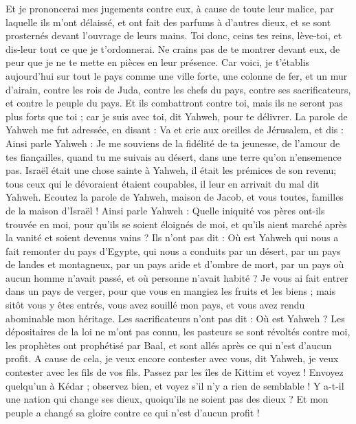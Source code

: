 \begin{multicols}{2}
Et je prononcerai mes jugements contre eux, à cause de toute leur malice, par laquelle ils m'ont délaissé, et ont fait des parfums à d'autres dieux, et se sont prosternés devant l'ouvrage de leurs mains. 
Toi donc, ceins tes reins, lève-toi, et dis-leur tout ce que je t'ordonnerai. Ne crains pas de te montrer devant eux, de peur que je ne te mette en pièces en leur présence.
Car voici, je t'établis aujourd'hui sur tout le pays comme une ville forte, une colonne de fer, et un mur d'airain, contre les rois de Juda, contre les chefs du pays, contre ses sacrificateurs, et contre le peuple du pays.
Et ils combattront contre toi, mais ils ne seront pas plus forts que toi ; car je suis avec toi, dit Yahweh, pour te délivrer.
\VerseOne{}La parole de Yahweh me fut adressée, en disant :
Va et crie aux oreilles de Jérusalem, et dis : Ainsi parle Yahweh : Je me souviens de la fidélité de ta jeunesse, de l'amour de tes fiançailles, quand tu me suivais au désert, dans une terre qu'on n'ensemence pas. 
Israël était une chose sainte à Yahweh, il était les prémices de son revenu; tous ceux qui le dévoraient étaient coupables, il leur en arrivait du mal dit Yahweh.
Ecoutez la parole de Yahweh, maison de Jacob, et vous toutes, familles de la maison d'Israël !
Ainsi parle Yahweh : Quelle iniquité vos pères ont-ils trouvée en moi, pour qu’ils se soient éloignés de moi, et qu’ils aient marché après la vanité et soient devenus vains ?
Ils n'ont pas dit : Où est Yahweh qui nous a fait remonter du pays d'Egypte, qui nous a conduits par un désert, par un pays de landes et montagneux, par un pays aride et d'ombre de mort, par un pays où aucun homme n'avait passé, et où personne n'avait habité ? 
Je vous ai fait entrer dans un pays de verger, pour que vous en mangiez les fruits et les biens ; mais sitôt vous y êtes entrés, vous avez souillé mon pays, et vous avez rendu abominable mon héritage.
Les sacrificateurs n'ont pas dit : Où est Yahweh ? Les dépositaires de la loi ne m'ont pas connu, les pasteurs se sont révoltés contre moi, les prophètes ont prophétisé par Baal, et sont allés après ce qui n'est d'aucun profit.
A cause de cela, je veux encore contester avec vous, dit Yahweh, je veux contester avec les fils de vos fils.
Passez par les îles de Kittim et voyez ! Envoyez quelqu'un à Kédar ; observez bien, et voyez s'il n'y a rien de semblable !
Y a-t-il une nation qui change ses dieux, quoiqu'ils ne soient pas des dieux ? Et mon peuple a changé sa gloire contre ce qui n'est d'aucun profit !

\end{multicols}
